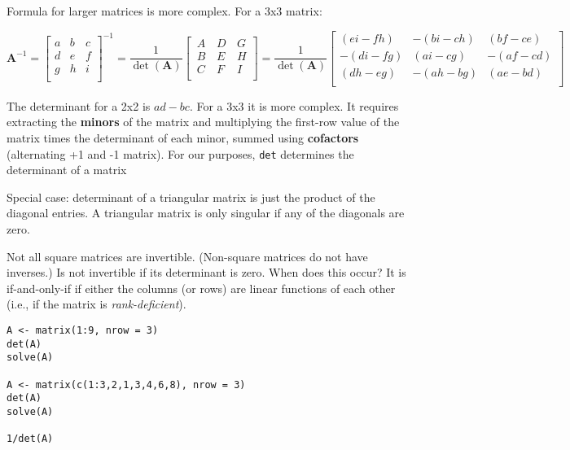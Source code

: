 \documentclass[a4paper,12pt]{article}
\begin{document}



Formula for larger matrices is more complex. For a 3x3 matrix:

\begin{equation*}
\mathbf{A}^{-1} = \begin{bmatrix}
a & b & c\\ d & e & f \\ g & h & i\\
\end{bmatrix}^{-1} =
\frac{1}{\det(\mathbf{A})} \begin{bmatrix}
\, A & \, D & \,G \\ \, B & \, E & \,H \\ \, C & \,F & \, I\\
\end{bmatrix} = 
\frac{1}{\det(\mathbf{A})} \begin{bmatrix}
(ei-fh) & -(bi-ch) & (bf-ce) \\
-(di-fg) & (ai-cg) & -(af-cd) \\
(dh-eg) & -(ah-bg) & (ae-bd)  \\
\end{bmatrix}
\end{equation*}

The determinant for a 2x2 is $ad-bc$. For a 3x3 it is more complex. It requires extracting the \textbf{minors} of the matrix and multiplying the first-row value of the matrix times the determinant of each minor, summed using \textbf{cofactors} (alternating +1 and -1 matrix). For our purposes, \texttt{det} determines the determinant of a matrix

Special case: determinant of a triangular matrix is just the product of the diagonal entries. A triangular matrix is only singular if any of the diagonals are zero.

Not all square matrices are invertible. (Non-square matrices do not have inverses.) Is not invertible if its determinant is zero. When does this occur? It is if-and-only-if if either the columns (or rows) are linear functions of each other (i.e., if the matrix is \textit{rank-deficient}).


\begin{lstlisting}
A <- matrix(1:9, nrow = 3)
det(A)
solve(A)

A <- matrix(c(1:3,2,1,3,4,6,8), nrow = 3)
det(A)
solve(A)

1/det(A) 
\end{lstlisting}
\end{document}
